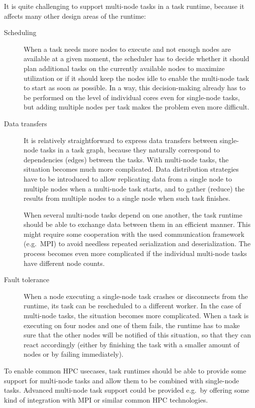 It is quite challenging to support multi-node tasks in a task runtime, because it affects many
other design areas of the runtime:
\begin{description}
    \item[Scheduling] When a task needs more nodes to execute and not enough nodes are
    available at a given moment, the scheduler has to decide whether it should plan additional
    tasks on the currently available nodes to maximize utilization or if it should keep the nodes
    idle to enable the multi-node task to start as soon as possible.
    In a way, this decision-making already has to be performed on the level of individual cores
    even for single-node tasks, but adding multiple nodes per task makes the problem even more
    difficult.
    \item[Data transfers] It is relatively straightforward to express data transfers between
    single-node tasks in a task graph, because they naturally correspond to dependencies (edges)
    between the tasks. With multi-node tasks, the situation becomes much more complicated. Data
    distribution strategies have to be introduced to allow replicating data from a single node
    to multiple nodes when a multi-node task starts, and to gather (reduce) the results from
    multiple nodes to a single node when such task finishes.

    When several multi-node tasks depend on one another, the task runtime should be able to
    exchange data between them in an efficient manner. This might require some cooperation with
    the used communication framework (e.g.\ MPI) to avoid needless repeated serialization and
    deserialization. The process becomes even more complicated if the individual multi-node tasks
    have different node counts.
    \item[Fault tolerance] When a node executing a single-node task crashes or disconnects from
    the runtime, its task can be rescheduled to a different worker. In the case of multi-node
    tasks, the situation becomes more complicated. When a task is executing on four nodes and
    one of them fails, the runtime has to make sure that the other nodes will be notified of
    this situation, so that they can react accordingly (either by finishing the task with a
    smaller amount of nodes or by failing immediately).
\end{description}

To enable common HPC usecases, task runtimes should be able to provide some support
for multi-node tasks and allow them to be combined with single-node tasks. Advanced multi-node
task support could be provided e.g.\ by offering some kind of integration with MPI or similar
common HPC technologies.

